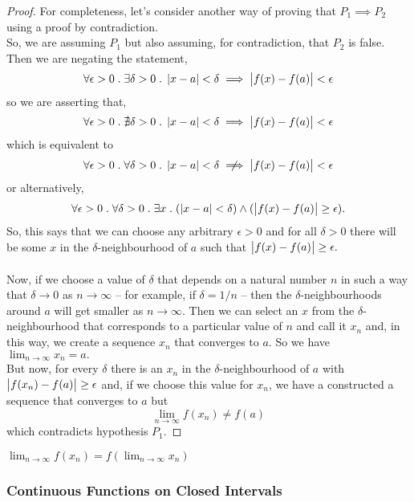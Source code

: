 \documentclass[../MathsNotesBase.tex]{subfiles}
\begin{document}
{\begin{proof}
			For completeness, let's consider another way of proving that ${ P_1 \implies P_2 }$ using a proof by contradiction.\\
			So, we are assuming $P_1$ but also assuming, for contradiction, that $P_2$ is false. Then we are negating the statement,
			\[ \forall \epsilon > 0 \;.\; \exists \delta > 0 \;.\; \left\lvert x - a\right\rvert < \delta \implies \left\lvert f(x) - f(a)\right\rvert < \epsilon \]
			so we are asserting that,
			\[ \forall \epsilon > 0 \;.\; \nexists \delta > 0 \;.\; \left\lvert x - a\right\rvert < \delta \implies \left\lvert f(x) - f(a)\right\rvert < \epsilon \]
			which is equivalent to
			\[ \forall \epsilon > 0 \logicsep \forall \delta > 0 \logicsep \abs{x - a} < \delta \centernot\implies \abs{f(x) - f(a)} < \epsilon \]
			or alternatively,
			\[ \forall \epsilon > 0 \;.\; \forall \delta > 0 \;.\; \exists x \;.\; (\left\lvert x - a\right\rvert < \delta) \wedge (\left\lvert f(x) - f(a)\right\rvert \geq \epsilon). \]
			So, this says that we can choose any arbitrary ${ \epsilon > 0 }$ and for all ${ \delta > 0 }$ there will be some $x$ in the $\delta$-neighbourhood of $a$ such that ${ \left\lvert f(x) - f(a)\right\rvert \geq \epsilon. }$\\\\
			Now, if we choose a value of $\delta$ that depends on a natural number $n$ in such a way that ${ \delta \to 0 }$ as ${ n \to \infty }$ -- for example, if ${ \delta = 1/n }$ -- then the $\delta$-neighbourhoods around $a$ will get smaller as ${ n \to \infty. }$ Then we can select an $x$ from the $\delta$-neighbourhood that corresponds to a particular value of $n$ and call it $x_n$ and, in this way, we create a sequence $x_n$ that converges to $a$. So we have ${ \lim_{n \to \infty} x_n = a. }$\\
			But now, for every $\delta$ there is an $x_n$ in the $\delta$-neighbourhood of $a$ with ${ \left\lvert f(x_n) - f(a)\right\rvert \geq \epsilon }$ and, if we choose this value for $x_n$, we have a constructed a sequence that converges to $a$ but
			\[ \lim_{n \to \infty} f(x_n) \neq f(a) \]
			which contradicts hypothesis $P_1$.
		\end{proof}
		\begin{corollary}
			\label{cor:lim_of_func_of_convergent_sequence_is_func_of_limit}
			${ \lim_{n \to \infty} f(x_n) = f(\lim_{n \to \infty} x_n) }$
		\end{corollary}
	
		\bigskip
		\subsubsection{Continuous Functions on Closed Intervals}
		
}
\end{document}
